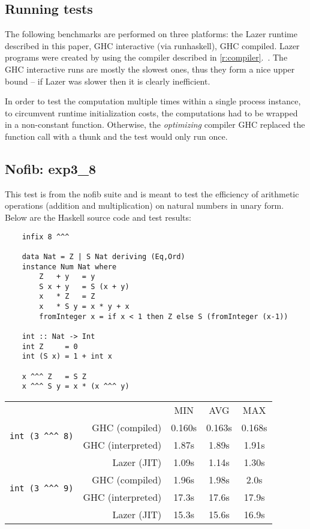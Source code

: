 \documentclass[en]{pracamgr}
\newcommand{\myref}[1]{\ref{#1}.~\textit{\nameref{#1}}}
\begin{document}
\subsection{Running tests}

The following benchmarks are performed on three platforms:
the Lazer runtime described in this paper,
GHC interactive (via runhaskell),
GHC compiled.
Lazer programs were created by using the compiler described in
\myref{r:compiler}.
The GHC interactive runs are mostly the slowest ones,
thus they form a nice upper bound -- if Lazer was slower
then it is clearly inefficient.

In order to test the computation multiple times
within a single process instance, to circumvent
runtime initialization costs, the computations had to be
wrapped in a non-constant function. Otherwise,
the \textit{optimizing} compiler GHC replaced the
function call with a thunk and the test would only run once.

\subsection{Nofib: exp3\_8}

This test is from the nofib suite and is meant to test
the efficiency of arithmetic operations (addition and multiplication)
on natural numbers in unary form. Below are the Haskell source
code and test results:

\begin{verbatim}
    infix 8 ^^^

    data Nat = Z | S Nat deriving (Eq,Ord)
    instance Num Nat where
        Z   + y   = y
        S x + y   = S (x + y)
        x   * Z   = Z
        x   * S y = x * y + x
        fromInteger x = if x < 1 then Z else S (fromInteger (x-1))

    int :: Nat -> Int
    int Z     = 0
    int (S x) = 1 + int x

    x ^^^ Z   = S Z
    x ^^^ S y = x * (x ^^^ y)
\end{verbatim}

\begin{center}
\begin{tabular}{c r c c c}
    & & MIN & AVG & MAX \\
    \cline{3-5}

    \multirow{2}{*}{\texttt{int (3 \^{}\^{}\^{} 8)}}
    & GHC (compiled)& 0.160s & 0.163s & 0.168s \\
    & GHC (interpreted)& 1.87s & 1.89s & 1.91s \\
    & Lazer (JIT)& 1.09s & 1.14s & 1.30s \\
    \cline{2-5}

    \multirow{2}{*}{\texttt{int (3 \^{}\^{}\^{} 9)}}
    & GHC (compiled)& 1.96s & 1.98s & 2.0s \\
    & GHC (interpreted)& 17.3s & 17.6s & 17.9s \\
    & Lazer (JIT)& 15.3s & 15.6s & 16.9s \\
\end{tabular}
\end{center}
\end{document}
